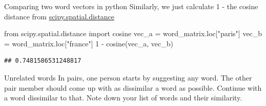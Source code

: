 \documentclass[
  10pt,
  ignorenonframetext,
  aspectratio=169]{beamer}
\newenvironment{Shaded}{\begin{snugshade}}{\end{snugshade}}
\newcommand{\DecValTok}[1]{\textcolor[rgb]{0.86,0.86,0.80}{#1}}
\newcommand{\ImportTok}[1]{\textcolor[rgb]{0.80,0.80,0.80}{#1}}
\newcommand{\NormalTok}[1]{\textcolor[rgb]{0.80,0.80,0.80}{#1}}
\newcommand{\OperatorTok}[1]{\textcolor[rgb]{0.94,0.94,0.82}{#1}}
\newcommand{\StringTok}[1]{\textcolor[rgb]{0.80,0.58,0.58}{#1}}
\begin{document}
\begin{frame}[fragile]{Comparing two word vectors in python}
\protect\hypertarget{comparing-two-word-vectors-in-python}{}
Similarly, we just calculate 1 - the cosine distance from
\href{https://docs.scipy.org/doc/scipy/reference/generated/scipy.spatial.distance.cosine.html}{scipy.spatial.distance}

\medskip

\begin{Shaded}
\begin{Highlighting}[]
\ImportTok{from}\NormalTok{ scipy.spatial.distance }\ImportTok{import}\NormalTok{ cosine}
\NormalTok{vec\_a }\OperatorTok{=}\NormalTok{ word\_matrix.loc[}\StringTok{"paris"}\NormalTok{]}
\NormalTok{vec\_b }\OperatorTok{=}\NormalTok{ word\_matrix.loc[}\StringTok{"france"}\NormalTok{]}
\DecValTok{1} \OperatorTok{{-}}\NormalTok{ cosine(vec\_a, vec\_b)}
\end{Highlighting}
\end{Shaded}

\begin{verbatim}
## 0.7481586531248817
\end{verbatim}
\end{frame}

\begin{frame}{Unrelated words}
\protect\hypertarget{unrelated-words}{}
In pairs, one person starts by suggesting any word. The other pair
member should come up with as dissimilar a word as possible. Continue
with a word dissimilar to that. Note down your list of words and their
similarity.
\end{frame}
\end{document}

